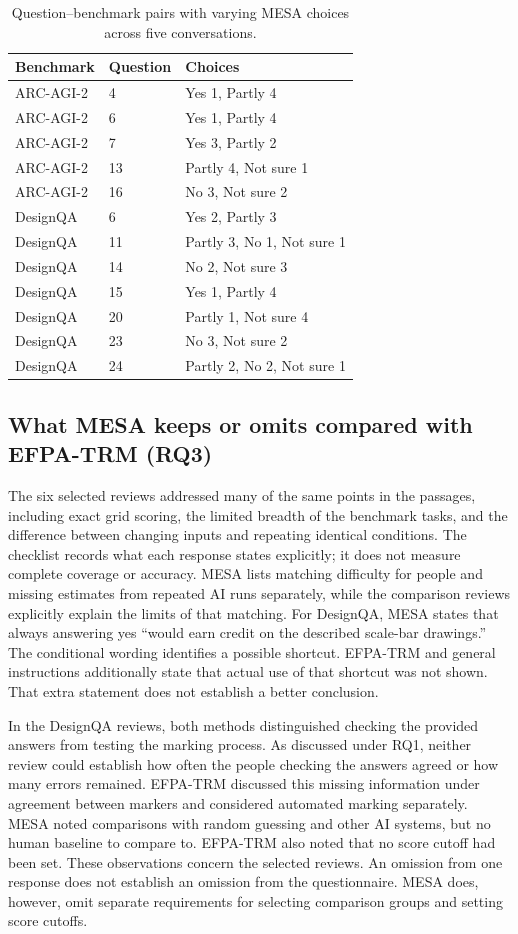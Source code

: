 \documentclass[10pt,conference]{IEEEtran}
\begin{document}
\begin{table}[t]
\caption{Question--benchmark pairs with varying MESA choices across five conversations.}
\label{tab:variation}
\centering
\small
\begin{tabular}{@{}llp{}@{}}
\toprule
Benchmark & Question & Choices \\
\midrule
ARC-AGI-2 & 4 & Yes 1, Partly 4 \\
ARC-AGI-2 & 6 & Yes 1, Partly 4 \\
ARC-AGI-2 & 7 & Yes 3, Partly 2 \\
ARC-AGI-2 & 13 & Partly 4, Not sure 1 \\
ARC-AGI-2 & 16 & No 3, Not sure 2 \\
DesignQA & 6 & Yes 2, Partly 3 \\
DesignQA & 11 & Partly 3, No 1, Not sure 1 \\
DesignQA & 14 & No 2, Not sure 3 \\
DesignQA & 15 & Yes 1, Partly 4 \\
DesignQA & 20 & Partly 1, Not sure 4 \\
DesignQA & 23 & No 3, Not sure 2 \\
DesignQA & 24 & Partly 2, No 2, Not sure 1 \\
\bottomrule
\end{tabular}
\end{table}

\subsection{What MESA keeps or omits compared with EFPA-TRM (RQ3)}
The six selected reviews addressed many of the same points in the passages, including exact grid scoring, the limited breadth of the benchmark tasks, and the difference between changing inputs and repeating identical conditions. The checklist records what each response states explicitly; it does not measure complete coverage or accuracy. MESA lists matching difficulty for people and missing estimates from repeated AI runs separately, while the comparison reviews explicitly explain the limits of that matching. For DesignQA, MESA states that always answering yes ``would earn credit on the described scale-bar drawings.'' The conditional wording identifies a possible shortcut. EFPA-TRM and general instructions additionally state that actual use of that shortcut was not shown. That extra statement does not establish a better conclusion.

In the DesignQA reviews, both methods distinguished checking the provided answers from testing the marking process. As discussed under RQ1, neither review could establish how often the people checking the answers agreed or how many errors remained. EFPA-TRM discussed this missing information under agreement between markers and considered automated marking separately. MESA noted comparisons with random guessing and other AI systems, but no human baseline to compare to. EFPA-TRM also noted that no score cutoff had been set. These observations concern the selected reviews. An omission from one response does not establish an omission from the questionnaire. MESA does, however, omit separate requirements for selecting comparison groups and setting score cutoffs.
\end{document}
